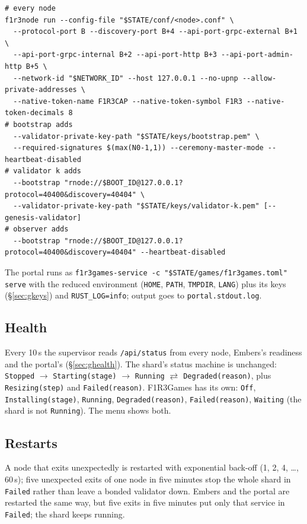 \documentclass[11pt]{article}
\theoremstyle{definition}
\theoremstyle{remark}
\newcommand{\code}[1]{\texttt{#1}}
\newcommand{\Gm}{F1R3Games}
\newcommand{\Em}{Embers}
\begin{document}
\begin{lstlisting}
# every node
f1r3node run --config-file "$STATE/conf/<node>.conf" \
  --protocol-port B --discovery-port B+4 --api-port-grpc-external B+1 \
  --api-port-grpc-internal B+2 --api-port-http B+3 --api-port-admin-http B+5 \
  --network-id "$NETWORK_ID" --host 127.0.0.1 --no-upnp --allow-private-addresses \
  --native-token-name F1R3CAP --native-token-symbol F1R3 --native-token-decimals 8
# bootstrap adds
  --validator-private-key-path "$STATE/keys/bootstrap.pem" \
  --required-signatures $(max(N0-1,1)) --ceremony-master-mode --heartbeat-disabled
# validator k adds
  --bootstrap "rnode://$BOOT_ID@127.0.0.1?protocol=40400&discovery=40404" \
  --validator-private-key-path "$STATE/keys/validator-k.pem" [--genesis-validator]
# observer adds
  --bootstrap "rnode://$BOOT_ID@127.0.0.1?protocol=40400&discovery=40404" --heartbeat-disabled
\end{lstlisting}

\noindent
The portal runs as \code{f1r3games-service -c "\$STATE/games/f1r3games.toml" serve}
with the reduced environment (\code{HOME}, \code{PATH}, \code{TMPDIR}, \code{LANG})
plus its keys (\S\ref{sec:gkeys}) and \code{RUST\_LOG=info}; output goes to
\code{portal.stdout.log}.

\subsection{Health}
Every 10\,s the supervisor reads \code{/api/status} from every node, \Em{}'s readiness
and the portal's (\S\ref{sec:ghealth}). The shard's status machine is unchanged:
\code{Stopped} $\to$ \code{Starting(stage)} $\to$ \code{Running}
$\rightleftarrows$ \code{Degraded(reason)}, plus \code{Resizing(step)} and
\code{Failed(reason)}. \Gm{} has its own: \code{Off}, \code{Installing(stage)},
\code{Running}, \code{Degraded(reason)}, \code{Failed(reason)}, \code{Waiting} (the
shard is not \code{Running}). The menu shows both.

\subsection{Restarts}
A node that exits unexpectedly is restarted with exponential back-off (1, 2, 4,
\ldots, 60\,s); five unexpected exits of one node in five minutes stop the whole shard
in \code{Failed} rather than leave a bonded validator down. \Em{} and the portal are
restarted the same way, but five exits in five minutes put only that service in
\code{Failed}; the shard keeps running.
\end{document}
